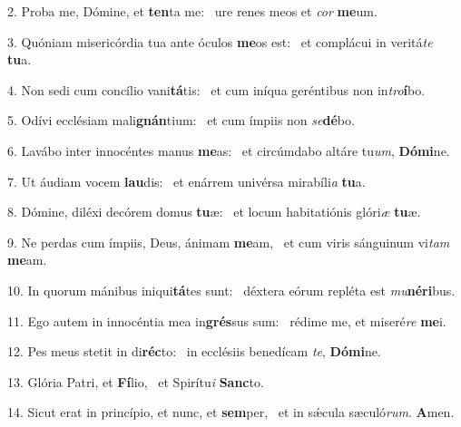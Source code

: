 2. Proba me, Dómine, et \textbf{ten}ta me: \ast\  ure renes meos et \textit{cor} \textbf{me}um.\

3. Quóniam misericórdia tua ante óculos \textbf{me}os est: \ast\  et complácui in veritá\textit{te} \textbf{tu}a.\

4. Non sedi cum concílio vani\textbf{tá}tis: \ast\  et cum iníqua geréntibus non in\textit{tro}\textbf{í}bo.\

5. Odívi ecclésiam mali\textbf{gnán}tium: \ast\  et cum ímpiis non \textit{se}\textbf{dé}bo.\

6. Lavábo inter innocéntes manus \textbf{me}as: \ast\  et circúmdabo altáre tu\textit{um}, \textbf{Dó}\textbf{mi}ne.\

7. Ut áudiam vocem \textbf{lau}dis: \ast\  et enárrem univérsa mirabíli\textit{a} \textbf{tu}a.\

8. Dómine, diléxi decórem domus \textbf{tu}æ: \ast\  et locum habitatiónis glóri\textit{æ} \textbf{tu}æ.\

9. Ne perdas cum ímpiis, Deus, ánimam \textbf{me}am, \ast\  et cum viris sánguinum vi\textit{tam} \textbf{me}am.\

10. In quorum mánibus iniqui\textbf{tá}tes sunt: \ast\  déxtera eórum repléta est \textit{mu}\textbf{né}\textbf{ri}bus.\

11. Ego autem in innocéntia mea in\textbf{grés}sus sum: \ast\  rédime me, et miseré\textit{re} \textbf{me}i.\

12. Pes meus stetit in di\textbf{réc}to: \ast\  in ecclésiis benedícam \textit{te}, \textbf{Dó}\textbf{mi}ne.\

13. Glória Patri, et \textbf{Fí}lio, \ast\  et Spirítu\textit{i} \textbf{Sanc}to.\

14. Sicut erat in princípio, et nunc, et \textbf{sem}per, \ast\  et in sǽcula sæculó\textit{rum}. \textbf{A}men.\

